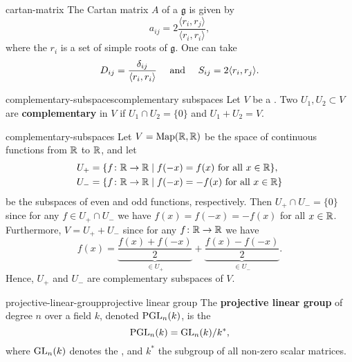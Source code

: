 \begin{example}{cartan-matrix}
    The Cartan matrix $A$ of a  $\mathfrak{g}$ is given by
    \[ a_{ij} = 2 \frac{\langle r_i, r_j \rangle}{\langle r_i, r_i \rangle} , \]
    where the $r_i$ is a set of simple roots of $\mathfrak{g}$. One can take
    \[ D_{ij} = \frac{\delta_{ij}}{\langle r_i, r_i \rangle} \quad \textup{ and } \quad S_{ij} = 2 \langle r_i, r_j \rangle . \]
\end{example}

\begin{topic}{complementary-subspaces}{complementary subspaces}
    Let $V$ be a . Two  $U_1, U_2 \subset V$ are \textbf{complementary} in $V$ if $U_1 \cap U_2 = \{ 0 \}$ and $U_1 + U_2 = V$.
\end{topic}

\begin{example}{complementary-subspaces}
    Let $V = \textup{Map}(\mathbb{R}, \mathbb{R})$ be the space of continuous functions from $\mathbb{R}$ to $\mathbb{R}$, and let
    \[ \begin{aligned}
        U_+ &= \{ f \colon \mathbb{R} \to \mathbb{R} \mid f(-x) = f(x) \textup{ for all } x \in \mathbb{R} \}, \\
        U_- &= \{ f \colon \mathbb{R} \to \mathbb{R} \mid f(-x) = -f(x) \textup{ for all } x \in \mathbb{R} \}
    \end{aligned} \]
    be the subspaces of even and odd functions, respectively. Then $U_+ \cap U_- = \{ 0 \}$ since for any $f \in U_+ \cap U_-$ we have $f(x) = f(-x) = -f(x)$ for all $x \in \mathbb{R}$. Furthermore, $V = U_+ + U_-$ since for any $f \colon \mathbb{R} \to \mathbb{R}$ we have
    \[ f(x) = \underbrace{\frac{f(x) + f(-x)}{2}}_{\in U_+} + \underbrace{\frac{f(x) - f(-x)}{2}}_{\in U_-} . \]
    Hence, $U_+$ and $U_-$ are complementary subspaces of $V$.
\end{example}

\begin{topic}{projective-linear-group}{projective linear group}
    The \textbf{projective linear group} of degree $n$ over a field $k$, denoted $\textup{PGL}_n(k)$, is the 
    \[ \textup{PGL}_n(k) = \textup{GL}_n(k) / k^* , \]
    where $\textup{GL}_n(k)$ denotes the , and $k^*$ the subgroup of all non-zero scalar matrices.
\end{topic}


